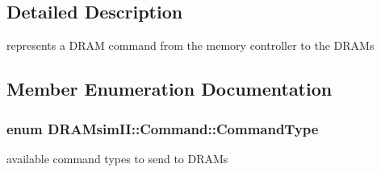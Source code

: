 \begin{CompactItemize}
\subsection{Detailed Description}
represents a DRAM command from the memory controller to the DRAMs 

\subsection{Member Enumeration Documentation}
\subsubsection[{CommandType}]{\setlength{\rightskip}{0pt plus 5cm}enum {\bf DRAMsimII::Command::CommandType}}\label{class_d_r_a_msim_i_i_1_1_command_6da0b8d60d4902551918e57f30350e92}


available command types to send to DRAMs 


\end{CompactItemize}
